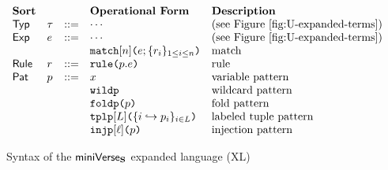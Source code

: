 {{{{\begin{figure}
\[\begin{array}{lllllll}
\textbf{Sort} & & 
& \textbf{Operational Form} 
& \textbf{Description}\\
\mathsf{Typ} & \tau & ::= 
& \cdots
& \text{(see Figure \ref{fig:U-expanded-terms})}\\
\mathsf{Exp} & e & ::= 
& \cdots 
& \text{(see Figure \ref{fig:U-expanded-terms})}\\
&&
& \aematchwith{n}{e}{\seqschemaX{r}}
& \text{match}\\
\mathsf{Rule} & r & ::= 
& \aematchrule{p}{e} 
& \text{rule}\\
\mathsf{Pat} & p & ::= 
& x  
& \text{variable pattern}\\
&&& \aewildp 
& \text{wildcard pattern}\\
&&& \aefoldp{p} 
& \text{fold pattern}\\
&&& \aetplp{\labelset}{\mapschema{p}{i}{\labelset}} 
& \text{labeled tuple pattern}\\
&&& \aeinjp{\ell}{p} 
& \text{injection pattern} %
\end{array}\]
\caption{Syntax of the $\mathsf{miniVerse}_\textbf{S}$ expanded language (XL)}
\label{fig:UP-expanded-terms}
\end{figure}


}}}}
